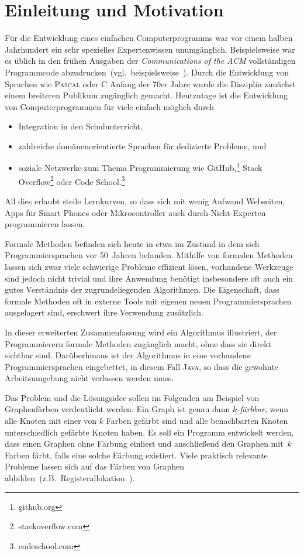 \documentclass[a4paper,fontsize=12pt,headings=small,captions=tableheading,%
numbers=endperiod,abstracton,pdftex]{scrartcl}
\begin{document}
\section{Einleitung und Motivation}
Für die Entwicklung eines einfachen Computerprogramms war vor einem halben
Jahrhundert ein sehr spezielles Expertenwissen unumgänglich.  Beispielsweise war
es üblich in den frühen Ausgaben der \textsl{Communications of the ACM}
vollständigen Programmcode abzudrucken~(vgl.~beispielsweise~\cite{Gib:75}).
Durch die Entwicklung von Sprachen wie \textsc{Pascal} oder \textsc{C} Anfang
der 70er Jahre wurde die Disziplin zunächst einem breiteren Publikum zugänglich
gemacht.  Heutzutage ist die Entwicklung von Computerprogrammen für viele
einfach möglich durch
\begin{itemize}
\item Integration in den Schulunterricht,
\item zahlreiche domänenorientierte Sprachen für dedizierte Probleme, und
\item soziale Netzwerke zum Thema Programmierung wie
  GitHub,\footnote{github.org} Stack Overflow\footnote{stackoverflow.com} oder
  Code School.\footnote{codeschool.com}
\end{itemize}
All dies erlaubt steile Lernkurven, so dass sich mit wenig Aufwand Webseiten,
Apps für Smart Phones oder Mikrocontroller auch durch Nicht-Experten
programmieren lassen.

Formale Methoden befinden sich heute in etwa im Zustand in dem sich
Programmiersprachen vor 50~Jahren befanden.  Mithilfe von formalen Methoden
lassen sich zwar viele schwierige Probleme effizient lösen, vorhandene Werkzeuge
sind jedoch nicht trivial und ihre Anwendung benötigt insbesondere oft auch ein
gutes Verständnis der zugrundeliegenden Algorithmen.  Die Eigenschaft, dass
formale Methoden oft in externe Tools mit eigenen neuen Programmiersprachen
ausgelagert sind, erschwert ihre Verwendung zusätzlich.

In dieser erweiterten Zusammenfassung wird ein Algorithmus illustriert, der
Programmierern formale Methoden zugänglich macht, ohne dass sie direkt sichtbar
sind.  Darüberhinaus ist der Algorithmus in eine vorhandene Programmiersprachen
eingebettet, in diesem Fall \textsc{Java}, so dass die gewohnte Arbeitsumgebung
nicht verlassen werden muss.

Das Problem und die Lösungsidee sollen im Folgenden am Beispiel von
Graphenfärben verdeutlicht werden.  Ein Graph ist genau dann \emph{$k$-färbbar},
wenn alle Knoten mit einer von $k$ Farben gefärbt sind und alle benachbarten
Knoten unterschiedlich gefärbte Knoten haben.  Es soll ein Programm entwickelt
werden, dass einen Graphen ohne Färbung einliest und anschließend den Graphen
mit~$k$ Farben färbt, falls eine solche Färbung existiert.  Viele praktisch
relevante Probleme lassen sich auf das Färben von Graphen
abbilden~(z.B.~Registerallokation~\cite{CAC+:81}).
\end{document}
